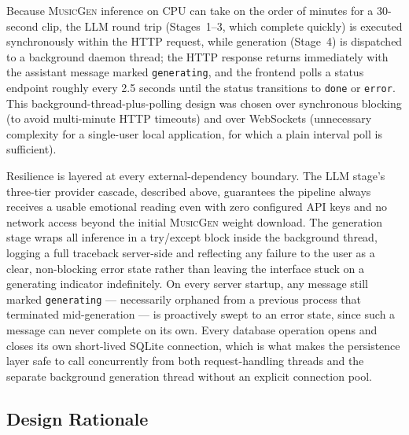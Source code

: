 \documentclass[11pt]{article}
\newcommand{\musicgen}{\textsc{MusicGen}}
\begin{document}
Because \musicgen{} inference on CPU can take on the order of minutes for a 30-second clip, the LLM round trip (Stages~1--3, which complete quickly) is executed synchronously within the HTTP request, while generation (Stage~4) is dispatched to a background daemon thread; the HTTP response returns immediately with the assistant message marked \texttt{generating}, and the frontend polls a status endpoint roughly every 2.5 seconds until the status transitions to \texttt{done} or \texttt{error}. This background-thread-plus-polling design was chosen over synchronous blocking (to avoid multi-minute HTTP timeouts) and over WebSockets (unnecessary complexity for a single-user local application, for which a plain interval poll is sufficient).

Resilience is layered at every external-dependency boundary. The LLM stage's three-tier provider cascade, described above, guarantees the pipeline always receives a usable emotional reading even with zero configured API keys and no network access beyond the initial \musicgen{} weight download. The generation stage wraps all inference in a try/except block inside the background thread, logging a full traceback server-side and reflecting any failure to the user as a clear, non-blocking error state rather than leaving the interface stuck on a generating indicator indefinitely. On every server startup, any message still marked \texttt{generating} --- necessarily orphaned from a previous process that terminated mid-generation --- is proactively swept to an error state, since such a message can never complete on its own. Every database operation opens and closes its own short-lived SQLite connection, which is what makes the persistence layer safe to call concurrently from both request-handling threads and the separate background generation thread without an explicit connection pool.

\subsection{Design Rationale}
\end{document}
